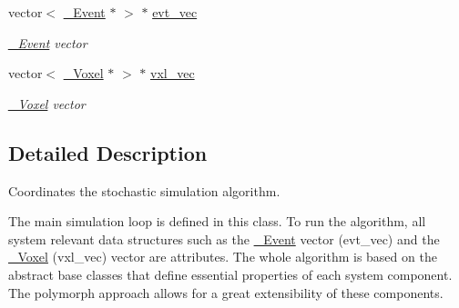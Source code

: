 \begin{DoxyCompactItemize}
vector$<$ \hyperlink{classnw_1_1___event}{\+\_\+\+Event} $\ast$ $>$ $\ast$ \hyperlink{classnw_1_1_gillespie___sys_a3f9b4464bed7135f51413c57f086aef7}{evt\+\_\+vec}
\begin{DoxyCompactList}\small\item\em \hyperlink{classnw_1_1___event}{\+\_\+\+Event} vector \end{DoxyCompactList}\item 
vector$<$ \hyperlink{classnw_1_1___voxel}{\+\_\+\+Voxel} $\ast$ $>$ $\ast$ \hyperlink{classnw_1_1_gillespie___sys_acf4d19490ed7a8447296d7c206ef0590}{vxl\+\_\+vec}
\begin{DoxyCompactList}\small\item\em \hyperlink{classnw_1_1___voxel}{\+\_\+\+Voxel} vector \end{DoxyCompactList}\end{DoxyCompactItemize}


\subsection{Detailed Description}
Coordinates the stochastic simulation algorithm. 

The main simulation loop is defined in this class. To run the algorithm, all system relevant data structures such as the \hyperlink{classnw_1_1___event}{\+\_\+\+Event} vector (evt\+\_\+vec) and the \hyperlink{classnw_1_1___voxel}{\+\_\+\+Voxel} (vxl\+\_\+vec) vector are attributes. The whole algorithm is based on the abstract base classes that define essential properties of each system component. The polymorph approach allows for a great extensibility of these components. 

